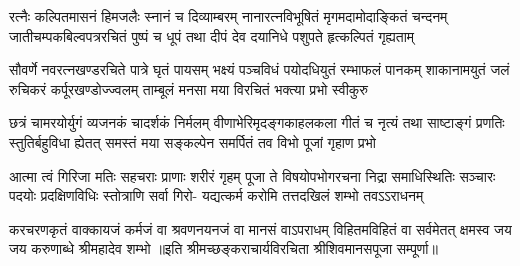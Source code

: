 
\fourlineindentedshloka
{रत्नैः कल्पितमासनं हिमजलैः स्नानं च दिव्याम्बरम्}
{नानारत्नविभूषितं मृगमदामोदाङ्कितं चन्दनम्}
{जातीचम्पकबिल्वपत्ररचितं पुष्पं च धूपं तथा}
{दीपं देव दयानिधे पशुपते हृत्कल्पितं गृह्यताम्}

\fourlineindentedshloka
{सौवर्णे नवरत्नखण्डरचिते पात्रे घृतं पायसम्}
{भक्ष्यं पञ्चविधं पयोदधियुतं रम्भाफलं पानकम्}
{शाकानामयुतं जलं रुचिकरं कर्पूरखण्डोज्ज्वलम्}
{ताम्बूलं मनसा मया विरचितं भक्त्या प्रभो स्वीकुरु}

\fourlineindentedshloka
{छत्रं चामरयोर्युगं व्यजनकं चादर्शकं निर्मलम्}
{वीणाभेरिमृदङ्गकाहलकला गीतं च नृत्यं तथा}
{साष्टाङ्गं प्रणतिः स्तुतिर्बहुविधा ह्येतत् समस्तं मया}
{सङ्कल्पेन समर्पितं तव विभो पूजां गृहाण प्रभो}

\fourlineindentedshloka
{आत्मा त्वं गिरिजा मतिः सहचराः प्राणाः शरीरं गृहम्}
{पूजा ते विषयोपभोगरचना निद्रा समाधिस्थितिः}
{सञ्चारः पदयोः प्रदक्षिणविधिः स्तोत्राणि सर्वा गिरो-}
{यद्यत्कर्म करोमि तत्तदखिलं शम्भो तवऽऽराधनम्}

\fourlineindentedshloka
{करचरणकृतं वाक्कायजं कर्मजं वा}
{श्रवणनयनजं वा मानसं वाऽपराधम्}
{विहितमविहितं वा सर्वमेतत् क्षमस्व}
{जय जय करुणाब्धे श्रीमहादेव शम्भो}
॥इति श्रीमच्छङ्कराचार्यविरचिता श्रीशिवमानसपूजा सम्पूर्णा॥
